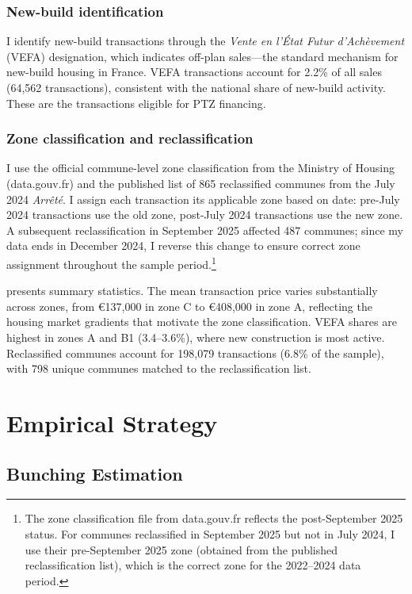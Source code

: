 \documentclass[12pt]{article}
\begin{document}
\subsubsection*{New-build identification} I identify new-build transactions through the \textit{Vente en l'\'{E}tat Futur d'Ach\`{e}vement} (VEFA) designation, which indicates off-plan sales---the standard mechanism for new-build housing in France. VEFA transactions account for 2.2\% of all sales (64,562 transactions), consistent with the national share of new-build activity. These are the transactions eligible for PTZ financing.

\subsubsection*{Zone classification and reclassification} I use the official commune-level zone classification from the Ministry of Housing (data.gouv.fr) and the published list of 865 reclassified communes from the July 2024 \textit{Arr\^{e}t\'{e}}. I assign each transaction its applicable zone based on date: pre-July 2024 transactions use the old zone, post-July 2024 transactions use the new zone. A subsequent reclassification in September 2025 affected 487 communes; since my data ends in December 2024, I reverse this change to ensure correct zone assignment throughout the sample period.\footnote{The zone classification file from data.gouv.fr reflects the post-September 2025 status. For communes reclassified in September 2025 but not in July 2024, I use their pre-September 2025 zone (obtained from the published reclassification list), which is the correct zone for the 2022--2024 data period.}



 presents summary statistics. The mean transaction price varies substantially across zones, from \euro137,000 in zone C to \euro408,000 in zone A, reflecting the housing market gradients that motivate the zone classification. VEFA shares are highest in zones A and B1 (3.4--3.6\%), where new construction is most active. Reclassified communes account for 198,079 transactions (6.8\% of the sample), with 798 unique communes matched to the reclassification list.

\section{Empirical Strategy}
\label{sec:strategy}

\subsection{Bunching Estimation}
\end{document}
